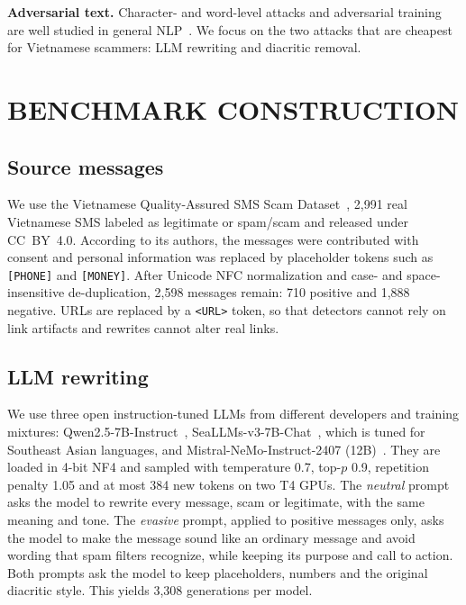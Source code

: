 \documentclass[11pt,a4paper]{article}
\begin{document}
\textbf{Adversarial text.} Character- and word-level attacks and adversarial training are well studied in general NLP~\cite{morris2020textattack}. We focus on the two attacks that are cheapest for Vietnamese scammers: LLM rewriting and diacritic removal.

\section{BENCHMARK CONSTRUCTION}\label{sec:bench}
\subsection{Source messages}
We use the Vietnamese Quality-Assured SMS Scam Dataset~\cite{vnsmsdataset}, 2,991 real Vietnamese SMS labeled as legitimate or spam/scam and released under CC~BY~4.0. According to its authors, the messages were contributed with consent and personal information was replaced by placeholder tokens such as \texttt{[PHONE]} and \texttt{[MONEY]}. After Unicode NFC normalization and case- and space-insensitive de-duplication, 2,598 messages remain: 710 positive and 1,888 negative. URLs are replaced by a \texttt{<URL>} token, so that detectors cannot rely on link artifacts and rewrites cannot alter real links.

\subsection{LLM rewriting}
We use three open instruction-tuned LLMs from different developers and training mixtures: Qwen2.5-7B-Instruct~\cite{qwen2025qwen25}, SeaLLMs-v3-7B-Chat~\cite{zhang2024seallms3}, which is tuned for Southeast Asian languages, and Mistral-NeMo-Instruct-2407 (12B)~\cite{mistral2024nemo}. They are loaded in 4-bit NF4 and sampled with temperature 0.7, top-$p$ 0.9, repetition penalty 1.05 and at most 384 new tokens on two T4 GPUs.
The \emph{neutral} prompt asks the model to rewrite every message, scam or legitimate, with the same meaning and tone. The \emph{evasive} prompt, applied to positive messages only, asks the model to make the message sound like an ordinary message and avoid wording that spam filters recognize, while keeping its purpose and call to action. Both prompts ask the model to keep placeholders, numbers and the original diacritic style. This yields 3,308 generations per model.
\end{document}
